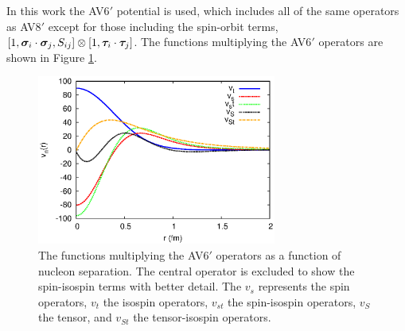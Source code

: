 In this work the AV6$'$ potential is used, which includes all of the same operators as AV8$'$ except for those including the spin-orbit terms, $\left[1,\bm{\sigma}_i\cdot\bm{\sigma}_j,S_{ij}\right]\otimes\left[1,\bm{\tau}_i\cdot\bm{\tau}_j\right]$. The functions multiplying the AV6$'$ operators are shown in Figure \ref{fig:vij}.
\begin{figure}[h!]
   \centering
   \includegraphics[width=0.7\textwidth]{figures/vij.eps}
   \caption{The functions multiplying the AV6$'$ operators as a function of nucleon separation. The central operator is excluded to show the spin-isospin terms with better detail. The $v_s$ represents the spin operators, $v_t$ the isospin operators, $v_{st}$ the spin-isospin operators, $v_S$ the tensor, and $v_{St}$ the tensor-isospin operators.}
   \label{fig:vij}
\end{figure}

